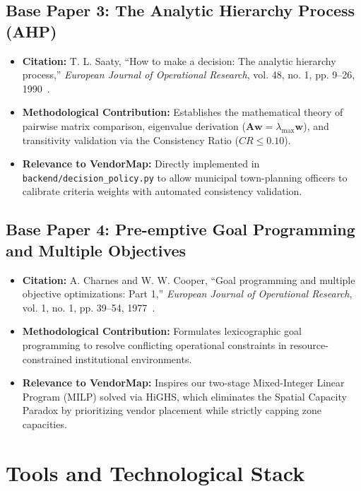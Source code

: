 \section*{Base Paper 3: The Analytic Hierarchy Process (AHP)}
\begin{itemize}
    \item \textbf{Citation:} T. L. Saaty, ``How to make a decision: The analytic hierarchy process,'' \textit{European Journal of Operational Research}, vol. 48, no. 1, pp. 9--26, 1990~\cite{saaty1990how}.
    \item \textbf{Methodological Contribution:} Establishes the mathematical theory of pairwise matrix comparison, eigenvalue derivation ($\mathbf{A}\mathbf{w} = \lambda_{\max}\mathbf{w}$), and transitivity validation via the Consistency Ratio ($CR \le 0.10$).
    \item \textbf{Relevance to VendorMap:} Directly implemented in \texttt{backend/decision\_policy.py} to allow municipal town-planning officers to calibrate criteria weights with automated consistency validation.
\end{itemize}

\section*{Base Paper 4: Pre-emptive Goal Programming and Multiple Objectives}
\begin{itemize}
    \item \textbf{Citation:} A. Charnes and W. W. Cooper, ``Goal programming and multiple objective optimizations: Part 1,'' \textit{European Journal of Operational Research}, vol. 1, no. 1, pp. 39--54, 1977~\cite{charnes1977goal}.
    \item \textbf{Methodological Contribution:} Formulates lexicographic goal programming to resolve conflicting operational constraints in resource-constrained institutional environments.
    \item \textbf{Relevance to VendorMap:} Inspires our two-stage Mixed-Integer Linear Program (MILP) solved via HiGHS, which eliminates the Spatial Capacity Paradox by prioritizing vendor placement while strictly capping zone capacities.
\end{itemize}

\clearpage

\chapter{Tools and Technological Stack}
\label{app:tools_used}


